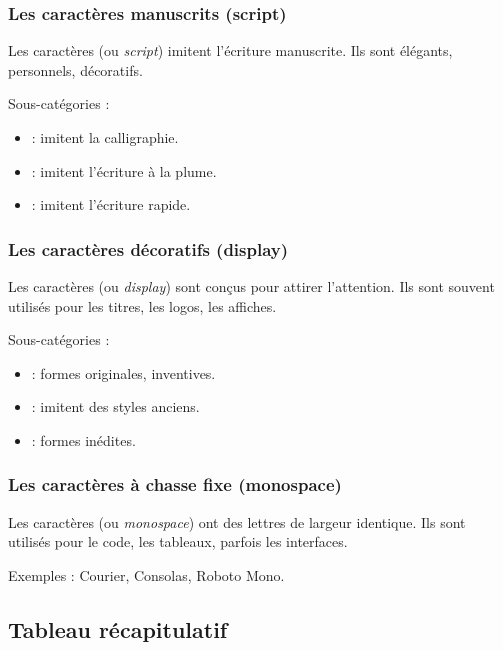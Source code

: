 \subsubsection{Les caractères manuscrits (script)}

Les caractères  (ou \emph{script}) imitent l'écriture manuscrite. Ils sont élégants, personnels, décoratifs.

Sous-catégories :

\begin{itemize}
    \item {} : imitent la calligraphie.
    \item {} : imitent l'écriture à la plume.
    \item {} : imitent l'écriture rapide.
\end{itemize}

\subsubsection{Les caractères décoratifs (display)}

Les caractères  (ou \emph{display}) sont conçus pour attirer l'attention. Ils sont souvent utilisés pour les titres, les logos, les affiches.

Sous-catégories :

\begin{itemize}
    \item {} : formes originales, inventives.
    \item {} : imitent des styles anciens.
    \item {} : formes inédites.
\end{itemize}

\subsubsection{Les caractères à chasse fixe (monospace)}

Les caractères  (ou \emph{monospace}) ont des lettres de largeur identique. Ils sont utilisés pour le code, les tableaux, parfois les interfaces.

Exemples : Courier, Consolas, Roboto Mono.

\subsection{Tableau récapitulatif}

